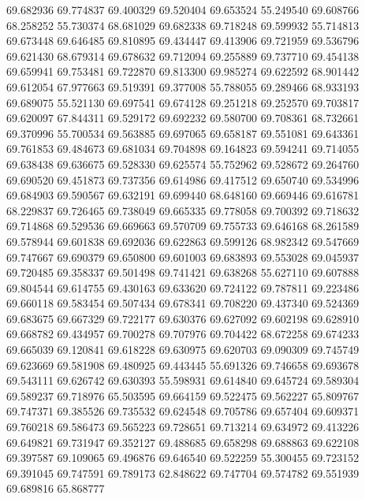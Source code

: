 69.682936
69.774837
69.400329
69.520404
69.653524
55.249540
69.608766
68.258252
55.730374
68.681029
69.682338
69.718248
69.599932
55.714813
69.673448
69.646485
69.810895
69.434447
69.413906
69.721959
69.536796
69.621430
68.679314
69.678632
69.712094
69.255889
69.737710
69.454138
69.659941
69.753481
69.722870
69.813300
69.985274
69.622592
68.901442
69.612054
67.977663
69.519391
69.377008
55.788055
69.289466
68.933193
69.689075
55.521130
69.697541
69.674128
69.251218
69.252570
69.703817
69.620097
67.844311
69.529172
69.692232
69.580700
69.708361
68.732661
69.370996
55.700534
69.563885
69.697065
69.658187
69.551081
69.643361
69.761853
69.484673
69.681034
69.704898
69.164823
69.594241
69.714055
69.638438
69.636675
69.528330
69.625574
55.752962
69.528672
69.264760
69.690520
69.451873
69.737356
69.614986
69.417512
69.650740
69.534996
69.684903
69.590567
69.632191
69.699440
68.648160
69.669446
69.616781
68.229837
69.726465
69.738049
69.665335
69.778058
69.700392
69.718632
69.714868
69.529536
69.669663
69.570709
69.755733
69.646168
68.261589
69.578944
69.601838
69.692036
69.622863
69.599126
68.982342
69.547669
69.747667
69.690379
69.650800
69.601003
69.683893
69.553028
69.045937
69.720485
69.358337
69.501498
69.741421
69.638268
55.627110
69.607888
69.804544
69.614755
69.430163
69.633620
69.724122
69.787811
69.223486
69.660118
69.583454
69.507434
69.678341
69.708220
69.437340
69.524369
69.683675
69.667329
69.722177
69.630376
69.627092
69.602198
69.628910
69.668782
69.434957
69.700278
69.707976
69.704422
68.672258
69.674233
69.665039
69.120841
69.618228
69.630975
69.620703
69.090309
69.745749
69.623669
69.581908
69.480925
69.443445
55.691326
69.746658
69.693678
69.543111
69.626742
69.630393
55.598931
69.614840
69.645724
69.589304
69.589237
69.718976
65.503595
69.664159
69.522475
69.562227
65.809767
69.747371
69.385526
69.735532
69.624548
69.705786
69.657404
69.609371
69.760218
69.586473
69.565223
69.728651
69.713214
69.634972
69.413226
69.649821
69.731947
69.352127
69.488685
69.658298
69.688863
69.622108
69.397587
69.109065
69.496876
69.646540
69.522259
55.300455
69.723152
69.391045
69.747591
69.789173
62.848622
69.747704
69.574782
69.551939
69.689816
65.868777
